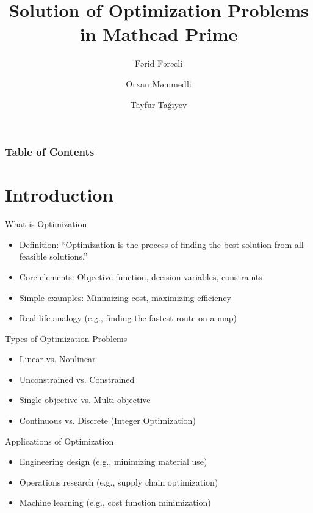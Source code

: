 \documentclass{beamer}
\title{\large Solution of Optimization Problems in Mathcad Prime\textsuperscript{\tiny\textregistered}}
\author{Fərid Fərəcli \and Orxan Məmmədli \and Tayfur Tağıyev}
\institute{Azerbaijan State Oil and Industry University}
\begin{document}
\maketitle

\begin{frame}
\frametitle{Table of Contents}
\tableofcontents
\end{frame}

\section{Introduction}

\begin{frame}{What is Optimization}
\begin{itemize}
\item Definition: “Optimization is the process of finding the best solution from all feasible solutions.”
\vspace{10pt}
\item Core elements: Objective function, decision variables, constraints
\vspace{10pt}
\item Simple examples: Minimizing cost, maximizing efficiency
\vspace{10pt}
\item Real-life analogy (e.g., finding the fastest route on a map)
\end{itemize}
\end{frame}

\begin{frame}{Types of Optimization Problems}
\begin{itemize}
\item Linear vs. Nonlinear
\item Unconstrained vs. Constrained
\item Single-objective vs. Multi-objective
\item Continuous vs. Discrete (Integer Optimization)
\end{itemize}
\end{frame}

\begin{frame}{Applications of Optimization}
\begin{itemize}
\item Engineering design (e.g., minimizing material use)
\item Operations research (e.g., supply chain optimization)
\item Machine learning (e.g., cost function minimization)
\end{itemize}
\end{frame}
\end{document}

